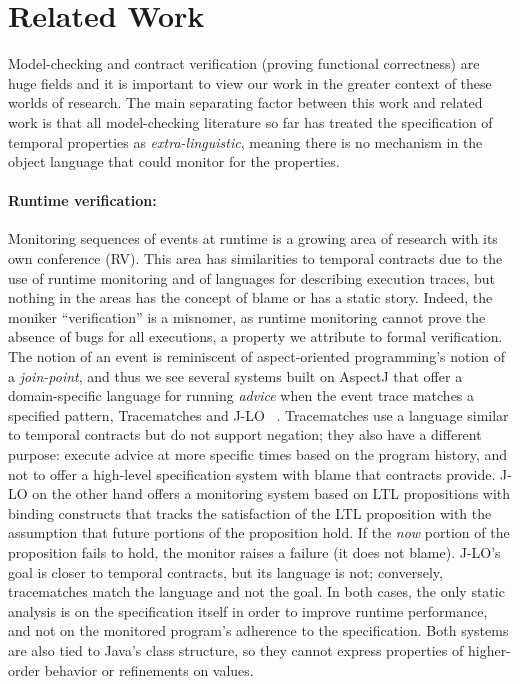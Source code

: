 \section{Related Work}

Model-checking and contract verification (proving functional correctness) are huge fields and it is important to view our work in the greater context of these worlds of research.
%
The main separating factor between this work and related work is that all model-checking literature so far has treated the specification of temporal properties as \emph{extra-linguistic}, meaning there is no mechanism in the object language that could monitor for the properties.

\paragraph{Runtime verification:}
Monitoring sequences of events at runtime is a growing area of research with its own conference (RV).
%
This area has similarities to temporal contracts due to the use of runtime monitoring and of languages for describing execution traces, but nothing in the areas has the concept of blame or has a static story.
%
Indeed, the moniker ``verification'' is a misnomer, as runtime monitoring cannot prove the absence of bugs for all executions, a property we attribute to formal verification.
%
The notion of an event is reminiscent of aspect-oriented programming's notion of a \emph{join-point}, and thus we see several systems built on AspectJ \citep{aspectj} that offer a domain-specific language for running \emph{advice} when the event trace matches a specified pattern, \eg Tracematches \citep{ianjohnson:Allan05addingtrace} and J-LO ~\citep{ianjohnson:jlo}.
%
Tracematches use a language similar to temporal contracts but do not support negation; they also have a different purpose: execute advice at more specific times based on the program history, and not to offer a high-level specification system with blame that contracts provide.
%
J-LO on the other hand offers a monitoring system based on LTL propositions with binding constructs that tracks the satisfaction of the LTL proposition with the assumption that future portions of the proposition hold.
%
If the \emph{now} portion of the proposition fails to hold, the monitor raises a failure (it does not blame).
%
J-LO's goal is closer to temporal contracts, but its language is not; conversely, tracematches match the language and not the goal.
%
In both cases, the only static analysis is on the specification itself in order to improve runtime performance, and not on the monitored program's adherence to the specification.
%
Both systems are also tied to Java's class structure, so they cannot express properties of higher-order behavior or refinements on values.

